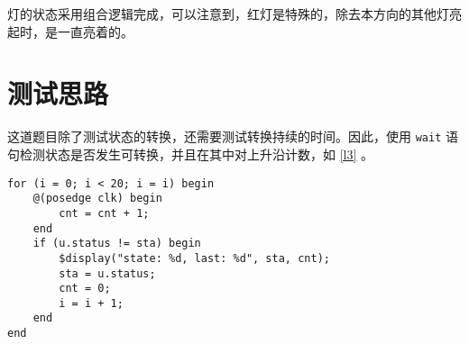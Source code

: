 \documentclass[lang=cn]{elegantpaper}
\begin{document}
灯的状态采用组合逻辑完成，可以注意到，红灯是特殊的，除去本方向的其他灯亮起时，是一直亮着的。

\section{测试思路}

这道题目除了测试状态的转换，还需要测试转换持续的时间。因此，使用 \lstinline{wait} 语句检测状态是否发生可转换，并且在其中对上升沿计数，如 \ref{l3} 。

\begin{lstlisting}[caption={状态计时},label={l3}]
for (i = 0; i < 20; i = i) begin
    @(posedge clk) begin
        cnt = cnt + 1; 
    end
    if (u.status != sta) begin
        $display("state: %d, last: %d", sta, cnt); 
        sta = u.status;
        cnt = 0;
        i = i + 1;
    end
end    
\end{lstlisting}
\end{document}
